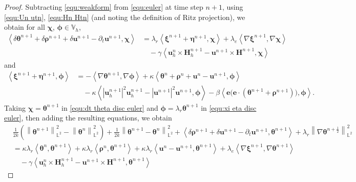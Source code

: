 \documentclass[11pt, reqno]{amsart}
\theoremstyle{definition}
\theoremstyle{remark}
\numberwithin{equation}{section}
\newcommand{\bff}{\boldsymbol}
\newcommand{\bb}{\mathbb}
\newcommand{\norm}[2]{\left\|{#1}\right\|_{#2}}
\newcommand{\inpro}[2]{\left\langle#1,#2\right\rangle}
\newcommand{\abs}[1]{\left|{#1}\right|}
\begin{document}
\begin{proof}
	Subtracting \eqref{equ:weakform} from \eqref{equ:euler} at time step $n+1$, using \eqref{equ:Un utn}, \eqref{equ:Hn Htn} (and noting the definition of Ritz projection), we obtain for all $\bff{\chi}$, $\bff{\phi}\in \bb{V}_h$,
	\begin{align}\label{equ:dt theta disc euler}
		\nonumber
		\inpro{\delta \bff{\theta}^{n+1} + \delta \bff{\rho}^{n+1} + \delta \bff{u}^{n+1}- \partial_t \bff{u}^{n+1}}{\bff{\chi}}
		&=
		\lambda_r \inpro{\bff{\xi}^{n+1}+\bff{\eta}^{n+1}}{\bff{\chi}}
		+
		\lambda_e \inpro{\nabla \bff{\xi}^{n+1}}{\nabla \bff{\chi}}
		\\
		&\quad 
		-
		\gamma \inpro{\bff{u}_h^n \times \bff{H}_h^{n+1} - \bff{u}^{n+1} \times \bff{H}^{n+1}}{\bff{\chi}}
	\end{align}
	and
	\begin{align}
		\nonumber
		\label{equ:xi eta disc euler}
		\inpro{\bff{\xi}^{n+1}+\bff{\eta}^{n+1}}{\bff{\phi}}
		&=
		-\inpro{\nabla \bff{\theta}^{n+1}}{\nabla \bff{\phi}}
		+
		\kappa \inpro{\bff{\theta}^n+\bff{\rho}^n+\bff{u}^n-\bff{u}^{n+1}}{\bff{\phi}}
		\\
		&\quad 
		-
		\kappa \inpro{\abs{\bff{u}_h^{n+1}}^2 \bff{u}_h^{n+1} - \abs{\bff{u}^{n+1}}^2 \bff{u}^{n+1}}{\bff{\phi}}
		-
		\beta \inpro{\bff{e}\big(\bff{e}\cdot (\bff{\theta}^{n+1}+\bff{\rho}^{n+1})\big)}{\bff{\phi}}.
	\end{align}
	Taking $\bff{\chi}= \bff{\theta}^{n+1}$ in \eqref{equ:dt theta disc euler} and $\bff{\phi}=\lambda_r \bff{\theta}^{n+1}$ in \eqref{equ:xi eta disc euler}, then adding the resulting equations, we obtain
	\begin{align}\label{equ:dt theta chi disc euler}
		\nonumber
		&\frac{1}{2k} \left( \norm{\bff{\theta}^{n+1}}{\bb{L}^2}^2 - \norm{\bff{\theta}^n}{\bb{L}^2}^2 \right)
		+
		\frac{1}{2k} \norm{\bff{\theta}^{n+1}-\bff{\theta}^n}{\bb{L}^2}^2
		+
		\inpro{\delta \bff{\rho}^{n+1} + \delta \bff{u}^{n+1} -\partial_t \bff{u}^{n+1}}{\bff{\theta}^{n+1}}
		+
		\lambda_r \norm{\nabla \bff{\theta}^{n+\frac{1}{2}}}{\bb{L}^2}^2
		\\
		\nonumber
		&=
		\kappa \lambda_r \inpro{\bff{\theta}^n}{\bff{\theta}^{n+1}}
		+
		\kappa\lambda_r \inpro{\bff{\rho}^{n}}{\bff{\theta}^{n+1}}
		+
		\kappa\lambda_r \inpro{\bff{u}^n-\bff{u}^{n+1}}{\bff{\theta}^{n+1}}
		+
		\lambda_e \inpro{\nabla \bff{\xi}^{n+1}}{\nabla \bff{\theta}^{n+1}}
		\\
		&\quad
		-
		\gamma \inpro{\bff{u}_h^n \times \bff{H}_h^{n+1} - \bff{u}^{n+1} \times \bff{H}^{n+1}}{\bff{\theta}^{n+1}}

\end{align}
\end{proof}
\end{document}
